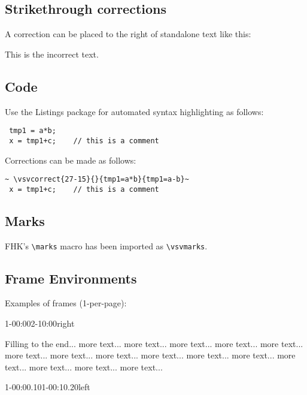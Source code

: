 

\subsection*{Strikethrough corrections}
A correction can be placed to the right of standalone text like this:

This is the incorrect text.


\subsection*{Code}
Use the Listings package for automated syntax highlighting as follows:

\lstset{style=customc}
\begin{lstlisting}
 tmp1 = a*b;
 x = tmp1+c;    // this is a comment
\end{lstlisting}

Corrections can be made as follows:

\lstset{style=customc}
\begin{lstlisting}
~ \vsvcorrect{27-15}{}{tmp1=a*b}{tmp1=a-b}~
 x = tmp1+c;    // this is a comment
\end{lstlisting}

\subsection*{Marks}

FHK's \verb=\marks= macro has been imported as \verb=\vsvmarks=.

\subsection*{Frame Environments}

Examples of frames (1-per-page):

\begin{vsvframe}{1-00:00}{2-10:00}{right}
\begin{enumerate}[(a)]
\lipsum[1]
\lipsum[2]
\lipsum[68]
Filling to the end... more text... more text... more text... more text... more text... more text... more text... more text... more text... more text... more text... more text... more text... more text... more text...
\end{enumerate}
\end{vsvframe}

\begin{vsvframe}{1-00:00.10}{1-00:10.20}{left}
\begin{enumerate}[(a)]
\lipsum[1]
\end{enumerate}
\end{vsvframe}


